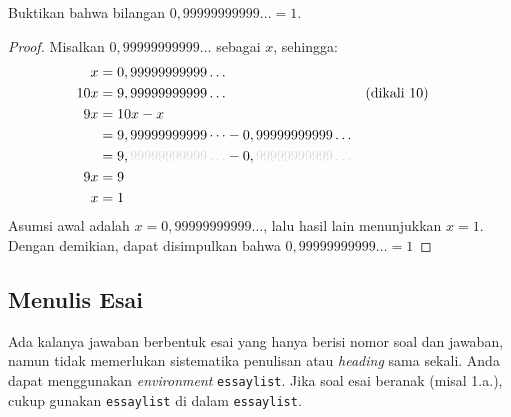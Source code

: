 \noindent Buktikan bahwa bilangan $0,99999999999\dots = 1$.

\begin{proof}
    Misalkan $0,99999999999\dots$ sebagai $x$, sehingga:
    \begin{align*}
        x &= 0,99999999999\dots \\
        10x &= 9,99999999999\dots &&\text{(dikali 10)} \\
        9x &= 10x - x \\
        &= 9,99999999999\dots - 0,99999999999\dots \\
        &= 9,\textcolor{gray!30}{99999999999\dots} - 0,\textcolor{gray!30}{99999999999\dots} \\
        9x &= 9 \\
        x &= 1
    \end{align*}
    Asumsi awal adalah $x = 0,99999999999\dots$, lalu hasil lain menunjukkan $x = 1$. Dengan demikian, dapat disimpulkan bahwa $0,99999999999\dots = 1$
\end{proof}

\subsection{Menulis Esai}

Ada kalanya jawaban berbentuk esai yang hanya berisi nomor soal dan jawaban, namun tidak memerlukan sistematika penulisan atau \textit{heading} sama sekali. Anda dapat menggunakan \textit{environment} \texttt{essaylist}. Jika soal esai beranak (misal 1.a.), cukup gunakan \texttt{essaylist} di dalam \texttt{essaylist}.

